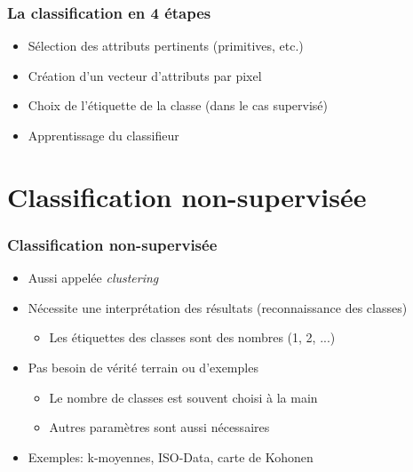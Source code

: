 \documentclass[compress,handout]{beamer}
\begin{document}
\begin{frame}
  \frametitle{La classification en 4 étapes}
  \begin{itemize}
  \item Sélection des attributs pertinents (primitives, etc.)
  \item Création d'un vecteur d'attributs par pixel
  \item Choix de l'étiquette de la classe (dans le cas supervisé)
  \item Apprentissage du classifieur
  \end{itemize}
\end{frame}
\section[Non-supervisé]{Classification non-supervisée}
\label{sec:unsupervised}
\begin{frame}
\frametitle{Classification non-supervisée}
  \begin{itemize}
  \item Aussi appelée {\em clustering}
  \item Nécessite une interprétation des résultats (reconnaissance des
    classes)
    \begin{itemize}
    \item Les étiquettes des classes sont des nombres (1, 2, ...)
    \end{itemize}
  \item Pas besoin de vérité terrain ou d'exemples
    \begin{itemize}
    \item Le nombre de classes est souvent choisi à la main
    \item Autres paramètres sont aussi nécessaires
    \end{itemize}
  \item Exemples: k-moyennes, ISO-Data, carte de Kohonen
  \end{itemize}
\end{frame}
\end{document}
